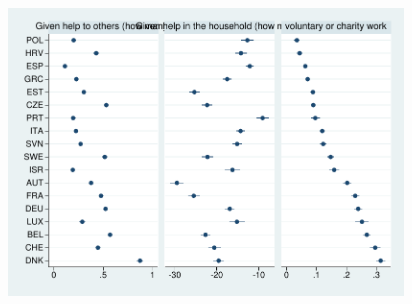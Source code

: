 \documentclass[10pt, letterpaper]{article}
\begin{document}
\begin{spacing}{1.4}
\begin{figure}[H]
 \includegraphics[height=3in]{tmp/ghto-ghih-volCha-means.pdf}\centering\label{ghto-ghih-volCha-means}
\caption{}
\end{figure}







\end{spacing}
\end{document}
